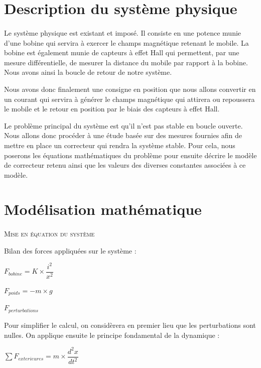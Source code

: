 \documentclass[11pt, french]{article} %
\begin{document}
\section{Description du système physique}
\paragraph{}

Le système physique est existant et imposé. Il consiste en une potence munie d'une bobine qui servira à exercer le champs magnétique retenant le mobile. La bobine est également munie de capteurs à effet Hall qui permettent, par une mesure différentielle, de mesurer la distance du mobile par rapport à la bobine. Nous avons ainsi la boucle de retour de notre système. 

Nous avons donc finalement une consigne en position que nous allons convertir en un courant qui servira à générer le champs magnétique qui attirera ou repoussera le mobile et le retour en position par le biais des capteurs à effet Hall. 

Le problème principal du système est qu'il n'est pas stable en boucle ouverte. Nous allons donc procéder à une étude basée sur des mesures fournies afin de mettre en place un correcteur qui rendra la système stable. Pour cela, nous poserons les équations mathématiques du problème pour ensuite décrire le modèle de correcteur retenu ainsi que les valeurs des diverses constantes associées à ce modèle.

\section{Modélisation mathématique}

\paragraph{}
\textsc{Mise en équation du système}

\noindent
Bilan des forces appliquées sur le système :

\smallskip
$ F_{bobine} = K \times \dfrac{i^2}{x^2}  $

$ F_{poids} = -m \times g $

$ F_{perturbations} $
 \medskip

\noindent
Pour simplifier le calcul, on considèrera en premier lieu que les perturbations sont nulles.
On applique ensuite le principe fondamental de la dynamique :

 \medskip
$ \sum F_{exterieures}  = m \times {\dfrac{{d^2}x}{dt^2}} $
 \medskip
\end{document}
